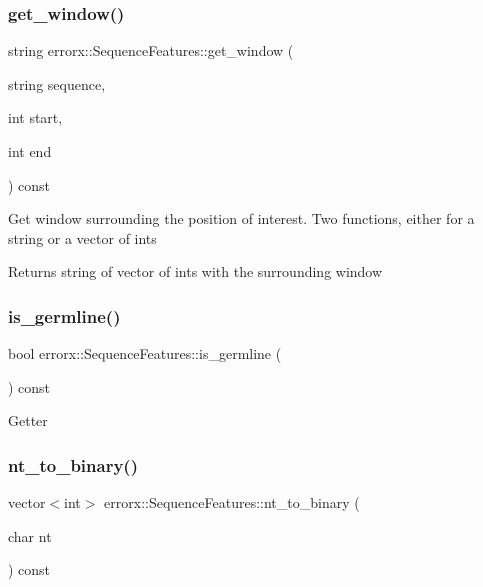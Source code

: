\subsubsection{\texorpdfstring{get\+\_\+window()}{get\_window()}}
{\footnotesize\ttfamily string errorx\+::\+Sequence\+Features\+::get\+\_\+window (\begin{DoxyParamCaption}\item[{string}]{sequence,  }\item[{int}]{start,  }\item[{int}]{end }\end{DoxyParamCaption}) const}

Get window surrounding the position of interest. Two functions, either for a string or a vector of ints

\begin{DoxyReturn}{Returns}
string of vector of ints with the surrounding window 
\end{DoxyReturn}
\mbox{\label{classerrorx_1_1_sequence_features_a154c6386de18b0200446e4f2e6935296}} 
\subsubsection{\texorpdfstring{is\+\_\+germline()}{is\_germline()}}
{\footnotesize\ttfamily bool errorx\+::\+Sequence\+Features\+::is\+\_\+germline (\begin{DoxyParamCaption}{ }\end{DoxyParamCaption}) const}

Getter \mbox{\label{classerrorx_1_1_sequence_features_a3af95ae62f69328d2fec423328130709}} 
\subsubsection{\texorpdfstring{nt\+\_\+to\+\_\+binary()}{nt\_to\_binary()}}
{\footnotesize\ttfamily vector$<$int$>$ errorx\+::\+Sequence\+Features\+::nt\+\_\+to\+\_\+binary (\begin{DoxyParamCaption}\item[{char}]{nt }\end{DoxyParamCaption}) const}

